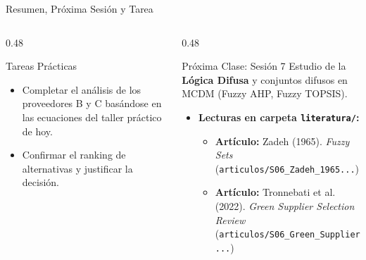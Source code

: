 \documentclass[aspectratio=169, 10pt]{beamer}
\begin{document}
\begin{frame}{Resumen, Próxima Sesión y Tarea}
    \begin{columns}[T]
        \begin{column}{0.48\textwidth}
            \begin{block}{Tareas Prácticas}
                \begin{itemize}
                    \item Completar el análisis de los proveedores B y C basándose en las ecuaciones del taller práctico de hoy.
                    \item Confirmar el ranking de alternativas y justificar la decisión.
                \end{itemize}
            \end{block}
        \end{column}
        
        \begin{column}{0.48\textwidth}
            \begin{exampleblock}{Próxima Clase: Sesión 7}
                Estudio de la \textbf{Lógica Difusa} y conjuntos difusos en MCDM (Fuzzy AHP, Fuzzy TOPSIS).
                \begin{itemize}
                    \scriptsize
                    \item \textbf{Lecturas en carpeta \texttt{literatura/}:}
                        \begin{itemize}
                            \tiny
                            \item \textbf{Artículo:} Zadeh (1965). \emph{Fuzzy Sets} (\texttt{articulos/S06\_Zadeh\_1965...})
                            \item \textbf{Artículo:} Tronnebati et al. (2022). \emph{Green Supplier Selection Review} (\texttt{articulos/S06\_Green\_Supplier...})
                        \end{itemize}
                \end{itemize}
            \end{exampleblock}
        \end{column}
    \end{columns}
\end{frame}


\closingframe
\end{document}

